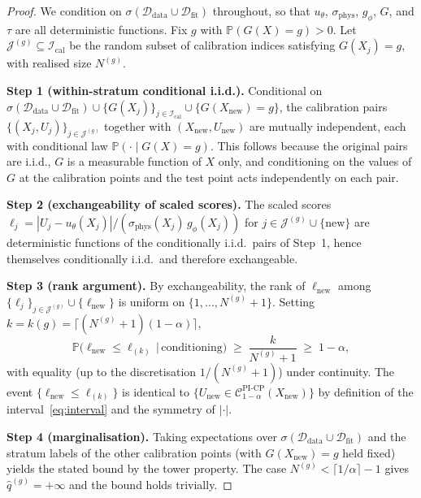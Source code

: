 \documentclass[11pt]{article}
\theoremstyle{definition}
\theoremstyle{remark}
\newcommand{\PP}{\mathbb{P}}
\newcommand{\Ddata}{\mathcal{D}_{\text{data}}}
\newcommand{\Dfit}{\mathcal{D}_{\text{fit}}}
\newcommand{\sphys}{\sigma_{\mathrm{phys}}}
\newcommand{\PICP}{\mathrm{PI\text{-}CP}}
\begin{document}
\begin{proof}
We condition on $\sigma(\Ddata \cup \Dfit)$ throughout, so that $u_\theta$, $\sphys$, $g_\phi$, $G$, and $\tau$ are all deterministic functions. Fix $g$ with $\PP(G(X) = g) > 0$. Let $\mathcal{J}^{(g)} \subseteq \mathcal{I}_{\text{cal}}$ be the random subset of calibration indices satisfying $G(X_j) = g$, with realised size $N^{(g)}$.

\textbf{Step 1 (within-stratum conditional i.i.d.).} Conditional on $\sigma(\Ddata \cup \Dfit) \cup \{G(X_j)\}_{j \in \mathcal{I}_{\text{cal}}} \cup \{G(X_{\text{new}}) = g\}$, the calibration pairs $\{(X_j, U_j)\}_{j \in \mathcal{J}^{(g)}}$ together with $(X_{\text{new}}, U_{\text{new}})$ are mutually independent, each with conditional law $\PP(\cdot \mid G(X) = g)$. This follows because the original pairs are i.i.d., $G$ is a measurable function of $X$ only, and conditioning on the values of $G$ at the calibration points and the test point acts independently on each pair.

\textbf{Step 2 (exchangeability of scaled scores).} The scaled scores $\ell_j = |U_j - u_\theta(X_j)|/(\sphys(X_j)\, g_\phi(X_j))$ for $j \in \mathcal{J}^{(g)} \cup \{\text{new}\}$ are deterministic functions of the conditionally i.i.d.\ pairs of Step~1, hence themselves conditionally i.i.d.\ and therefore exchangeable.

\textbf{Step 3 (rank argument).} By exchangeability, the rank of $\ell_{\text{new}}$ among $\{\ell_j\}_{j \in \mathcal{J}^{(g)}} \cup \{\ell_{\text{new}}\}$ is uniform on $\{1, \dots, N^{(g)} + 1\}$. Setting $k = k(g) = \lceil (N^{(g)} + 1)(1 - \alpha) \rceil$,
\begin{equation}
    \PP\big(\ell_{\text{new}} \leq \ell_{(k)} \,\big|\, \text{conditioning}\big) \;\geq\; \frac{k}{N^{(g)} + 1} \;\geq\; 1 - \alpha,
\end{equation}
with equality (up to the discretisation $1/(N^{(g)}+1)$) under continuity. The event $\{\ell_{\text{new}} \leq \ell_{(k)}\}$ is identical to $\{U_{\text{new}} \in \mathcal{C}^{\PICP}_{1-\alpha}(X_{\text{new}})\}$ by definition of the interval~\eqref{eq:interval} and the symmetry of $|\cdot|$.

\textbf{Step 4 (marginalisation).} Taking expectations over $\sigma(\Ddata \cup \Dfit)$ and the stratum labels of the other calibration points (with $G(X_{\text{new}}) = g$ held fixed) yields the stated bound by the tower property. The case $N^{(g)} < \lceil 1/\alpha \rceil - 1$ gives $\hat{q}^{(g)} = +\infty$ and the bound holds trivially.
\end{proof}
\end{document}
